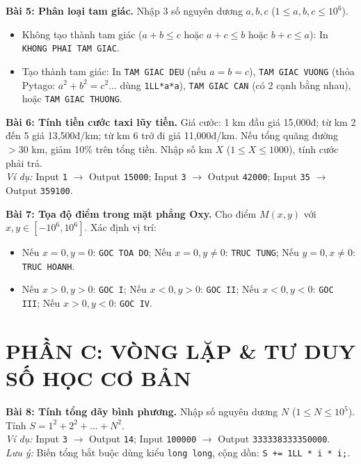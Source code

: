 \documentclass[11pt,a4paper]{article}
\begin{document}
\textbf{\color{AsianBlue}Bài 5: Phân loại tam giác.} Nhập 3 số nguyên dương $a, b, c$ ($1 \le a, b, c \le 10^6$).
\begin{itemize}
    \setlength{\itemsep}{0.5pt}
    \footnotesize
    \item Không tạo thành tam giác ($a+b \le c$ hoặc $a+c \le b$ hoặc $b+c \le a$): In \texttt{KHONG PHAI TAM GIAC}.
    \item Tạo thành tam giác: In \texttt{TAM GIAC DEU} (nếu $a=b=c$), \texttt{TAM GIAC VUONG} (thỏa Pytago: $a^2+b^2=c^2 \dots$ dùng \texttt{1LL*a*a}), \texttt{TAM GIAC CAN} (có 2 cạnh bằng nhau), hoặc \texttt{TAM GIAC THUONG}.
\end{itemize}

\newpage

\textbf{\color{AsianBlue}Bài 6: Tính tiền cước taxi lũy tiến.} Giá cước: 1 km đầu giá 15,000đ; từ km 2 đến 5 giá 13,500đ/km; từ km 6 trở đi giá 11,000đ/km. Nếu tổng quãng đường $> 30$ km, giảm 10\% trên tổng tiền. Nhập số km $X$ ($1 \le X \le 1000$), tính cước phải trả.\\
\textit{Ví dụ:} Input \texttt{1} $\to$ Output \texttt{15000}; Input \texttt{3} $\to$ Output \texttt{42000}; Input \texttt{35} $\to$ Output \texttt{359100}.

\vspace{0.15cm}
\noindent
\textbf{\color{AsianBlue}Bài 7: Tọa độ điểm trong mặt phẳng Oxy.} Cho điểm $M(x, y)$ với $x, y \in [-10^6, 10^6]$. Xác định vị trí:
\begin{itemize}
    \setlength{\itemsep}{0.5pt}
    \footnotesize
    \item Nếu $x=0, y=0$: \texttt{GOC TOA DO}; Nếu $x=0, y\ne 0$: \texttt{TRUC TUNG}; Nếu $y=0, x\ne 0$: \texttt{TRUC HOANH}.
    \item Nếu $x>0, y>0$: \texttt{GOC I}; Nếu $x<0, y>0$: \texttt{GOC II}; Nếu $x<0, y<0$: \texttt{GOC III}; Nếu $x>0, y<0$: \texttt{GOC IV}.
\end{itemize}

\vspace{-0.2cm}
\section*{\color{AsianDarkBlue}\small PHẦN C: VÒNG LẶP \& TƯ DUY SỐ HỌC CƠ BẢN}
\vspace{-0.2cm}

\textbf{\color{AsianBlue}Bài 8: Tính tổng dãy bình phương.} Nhập số nguyên dương $N$ ($1 \le N \le 10^5$). Tính $S = 1^2 + 2^2 + \dots + N^2$.\\
\textit{Ví dụ:} Input \texttt{3} $\to$ Output \texttt{14}; Input \texttt{100000} $\to$ Output \texttt{333338333350000}.\\
\textit{Lưu ý:} Biến tổng bắt buộc dùng kiểu \texttt{long long}, cộng dồn: \texttt{S += 1LL * i * i;}.
\end{document}
